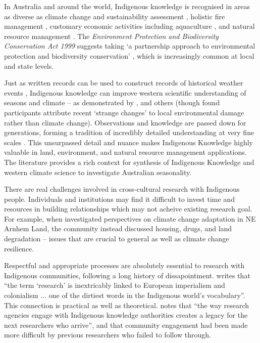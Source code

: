 In Australia and around the world, Indigenous knowledge is recognised
in areas as diverse as climate change and sustainability assessment
\citep[eg.][]{cochran2015}, holistic fire management \citep[eg.][]{clarke2009,price2012},
customary economic activities including aquaculture \citep{woodward2012a}, and
natural resource management \citep[eg.][]{prober2011}.  The \textit{Environment
Protection and Biodiversity Conservation Act 1999} suggests taking `a
partnership approach to environmental protection and biodiversity conservation'
\citep{ens2012}, which is increasingly common at local and state levels.


Just as written records can be used to construct records of historical weather
events \citep[eg.][]{rodrigo1999}, Indigenous knowledge can improve western
scientific understanding of seasons and climate -- as demonstrated by
\citet{green2010a,clarke2009}, and others (though \citet{green2010a} found
participants attribute recent `strange changes' to local environmental damage
rather than climate change).
%
Observations and knowledge are passed down for generations, forming a
tradition of incredibly detailed understanding at very fine scales \citep{barber2005}.
This unsurpassed detail and nuance makes Indigenous Knowledge highly valuable
in land, environment, and natural resource management applications.
The literature provides a rich context for synthesis of Indigenous Knowledge
and western climate science to investigate Australian seasonality.


There are real challenges involved in cross-cultural research with
Indigenous people.  Individuals and institutions may find it difficult to
invest time and resources in building relationships which may not acheive
existing research goal.  For example, when \citet{petheram2010}
investigated perspectives on climate change adaptation in NE Arnhem Land,
the community instead discussed housing, drugs, and land degradation -- issues
that are crucial to general as well as climate change resilience.

Respectful and appropriate processes are absolutely essential to research with Indigenous communities,
following a long history of dissapointment.  \citet{smith1999} writes that ``the term
`research' is inextricably linked to European imperialism and colonialism ...
one of the dirtiest words in the Indigenous world's vocabulary''. This
connection is practical as well as theoretical.  \citet{woodward2010} notes
that ``the way research agencies engage with Indigenous knowledge authorities
creates a legacy for the next researchers who arrive'', and that community
engagement had been made more difficult by previous researchers who failed to
follow through.

